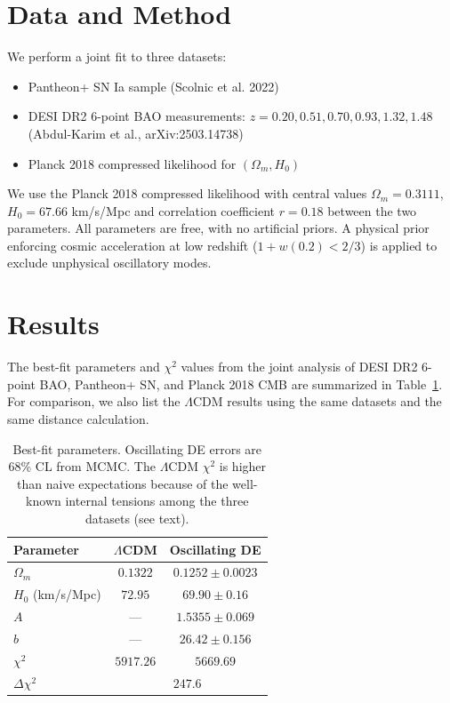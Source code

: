 \documentclass[10pt,twocolumn]{article}
\begin{document}
\section{Data and Method}
We perform a joint fit to three datasets:
\begin{itemize}
\item Pantheon+ SN Ia sample (Scolnic et al. 2022)
\item DESI DR2 6-point BAO measurements: $z=0.20,0.51,0.70,0.93,1.32,1.48$ (Abdul-Karim et al., arXiv:2503.14738)
\item Planck 2018 compressed likelihood for $(\Omega_m, H_0)$
\end{itemize}
We use the Planck 2018 compressed likelihood with central values
$\Omega_m=0.3111$, $H_0=67.66$ km/s/Mpc
and correlation coefficient $r=0.18$ between the two parameters.
All parameters are free, with no artificial priors.
A physical prior enforcing cosmic acceleration at low redshift ($1+w(0.2)<2/3$) is applied to exclude unphysical oscillatory modes.

\section{Results}
The best-fit parameters and $\chi^2$ values from the joint analysis of DESI DR2 6-point BAO, Pantheon+ SN, and Planck 2018 CMB are summarized in Table~\ref{tab:bestfit}. For comparison, we also list the $\Lambda$CDM results using the same datasets and the same distance calculation.

\begin{table}[htbp]
\centering
\caption{Best-fit parameters. Oscillating DE errors are 68\% CL from MCMC. The $\Lambda$CDM $\chi^2$ is higher than naive expectations because of the well-known internal tensions among the three datasets (see text).}
\begin{tabular}{lcc}
\hline
Parameter & $\Lambda$CDM & Oscillating DE \\
\hline
$\Omega_m$    & $0.1322$ & $0.1252\pm0.0023$ \\
$H_0$ (km/s/Mpc) & $72.95$ & $69.90\pm0.16$ \\
$A$           & --- & $1.5355\pm0.069$ \\
$b$           & --- & $26.42\pm0.156$ \\
$\chi^2$      & $5917.26$ & $5669.69$ \\
$\Delta\chi^2$& \multicolumn{2}{c}{$247.6$} \\
\hline
\end{tabular}
\label{tab:bestfit}
\end{table}
\end{document}
